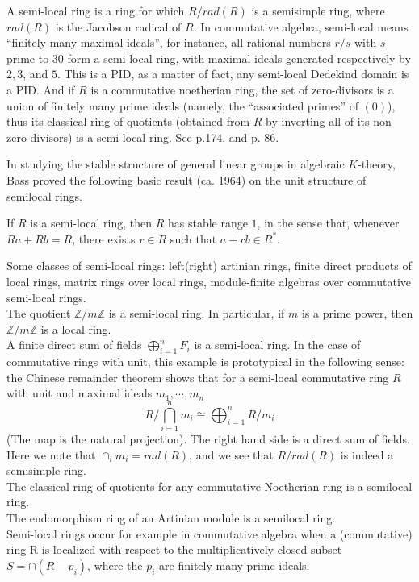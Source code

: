A semi-local ring is a ring for which $R/rad(R)$ is a semisimple ring, where $rad(R)$ is the Jacobson radical of $R$. In commutative algebra, semi-local means ``finitely many maximal ideals'', for instance, all rational numbers $r/s$ with $s$ prime to $30$ form a semi-local ring, with maximal ideals generated respectively by $2,3$, and $5$. This is a PID, as a matter of fact, any semi-local Dedekind domain is a PID. And if $R$ is a commutative noetherian ring, the set of zero-divisors is a union of finitely many prime ideals (namely, the ``associated primes'' of $(0)$), thus its classical ring of quotients (obtained from $R$ by inverting all of its non zero-divisors) is a semi-local ring. See \cite{book:975816} p.174. and \cite{MR40:2736} p. 86.



In studying the stable structure of general linear groups in algebraic $K$-theory, Bass proved the following basic result (ca. 1964) on  the  unit
structure  of semilocal rings.
\begin{theorem}
	 If $R$ is a semi-local ring, then $R$ has stable range $1$,
in the sense that, whenever $Ra + Rb = R$, there exists $r \in R$ such that
$a + rb \in R^*$.
\end{theorem}
\begin{example}
Some classes of semi-local rings: left(right) artinian rings, finite direct products of local rings, matrix rings over local rings, module-finite algebras over commutative semi-local rings.\\
The quotient $\mathbb{Z}/m\mathbb{Z}$ is a semi-local ring. In particular, if $m$ is a prime power, then $\mathbb{Z}/m\mathbb{Z}$ is a local ring.\\
A finite direct sum of fields $\bigoplus_{i=1}^n{F_i}$ is a semi-local ring.
In the case of commutative rings with unit, this example is prototypical in the following sense: the Chinese remainder theorem shows that for a semi-local commutative ring $R$ with unit and maximal ideals $m_1, \cdots, m_n$
\[R/\bigcap_{i=1}^n m_i\cong\bigoplus_{i=1}^n R/m_i\]
(The map is the natural projection). The right hand side is a direct sum of fields. Here we note that $\cap_i m_i=rad(R)$, and we see that $R/rad(R)$ is indeed a semisimple ring.\\
The classical ring of quotients for any commutative Noetherian ring is a semilocal ring.\\
The endomorphism ring of an Artinian module is a semilocal ring.\\
Semi-local rings occur for example in commutative algebra when a (commutative) ring R is localized with respect to the multiplicatively closed subset $S = \cap (R - p_i)$, where the $p_i$ are finitely many prime ideals.
\end{example}


